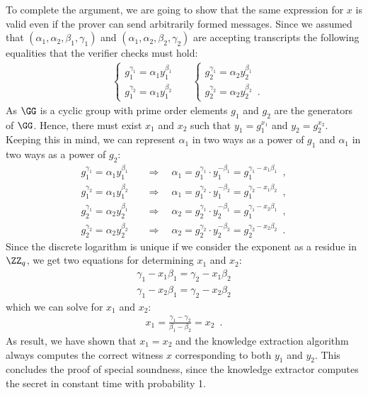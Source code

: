 \documentclass{crypto-exercise}
\begin{document}
\begin{solution}
To complete the argument, we are going to show that the same expression for $x$ is valid even if the prover can send arbitrarily formed messages. Since we assumed that $(\alpha_1, \alpha_2, \beta_1, \gamma_1)$ and $(\alpha_1, \alpha_2, \beta_2, \gamma_2)$ are accepting transcripts the following equalities that the verifier checks must hold:
\begin{align*}
&\begin{cases}
g_1^{\gamma_1} = \alpha_1 y_1^{\beta_1}\\
g_1^{\gamma_2} = \alpha_1 y_1^{\beta_2}
\end{cases}
&
&\begin{cases}
g_2^{\gamma_1} = \alpha_2 y_2^{\beta_1}\\
g_2^{\gamma_2} = \alpha_2 y_2^{\beta_2}\enspace.
\end{cases}
\end{align*}
As $\GG$ is a cyclic group with prime order elements $g_1$ and $g_2$ are the generators of $\GG$. Hence, there must exist $x_1$ and $x_2$ such that $y_1=g_1^{x_1}$ and $y_2=g_2^{x_2}$. Keeping this in mind, we can represent $\alpha_1$ in two ways as a power of $g_1$ and $\alpha_1$ in two ways as a power of $g_2$: 
\begin{align*}
g_1^{\gamma_1} = \alpha_1 y_1^{\beta_1}\quad&\Rightarrow\quad \alpha_1 = g_1^{\gamma_1}\cdot y_1^{-\beta_1} = g_1^{\gamma_1 - x_1\beta_1}\enspace,\\
g_1^{\gamma_2} = \alpha_1 y_1^{\beta_2}\quad&\Rightarrow\quad \alpha_1 =  g_1^{\gamma_2}\cdot y_1^{-\beta_2} = g_1^{\gamma_2 - x_1\beta_2}\enspace,\\
g_2^{\gamma_1} = \alpha_2 y_2^{\beta_1}\quad&\Rightarrow\quad \alpha_2 = g_2^{\gamma_1}\cdot y_2^{-\beta_1} = g_1^{\gamma_1 - x_2\beta_1}\enspace,\\
g_2^{\gamma_2} = \alpha_2 y_2^{\beta_2}\quad&\Rightarrow\quad \alpha_2 =  g_2^{\gamma_2}\cdot y_2^{-\beta_2} = g_2^{\gamma_2 - x_2\beta_2}\enspace.
\end{align*}
Since the discrete logarithm is unique if we consider the exponent as a residue in $\ZZ_q$, we get two equations for determining $x_1$ and $x_2$: 
\begin{align*}
\gamma_1 - x_1\beta_1 = \gamma_2 - x_1\beta_2 \\
\gamma_1 - x_2\beta_1 = \gamma_2 - x_2\beta_2 
\end{align*}
which we can solve for $x_1$ and $x_2$:
\begin{align*}
x_1 = \frac{\gamma_1 - \gamma_2}{\beta_1 - \beta_2}=x_2\enspace.
\end{align*}
As result, we have shown that $x_1=x_2$ and the knowledge extraction algorithm always computes the correct witness $x$ corresponding to both $y_1$ and $y_2$. This concludes the proof of special soundness, since the knowledge extractor computes the secret in constant time with probability 1.


\end{solution}
\end{document}
